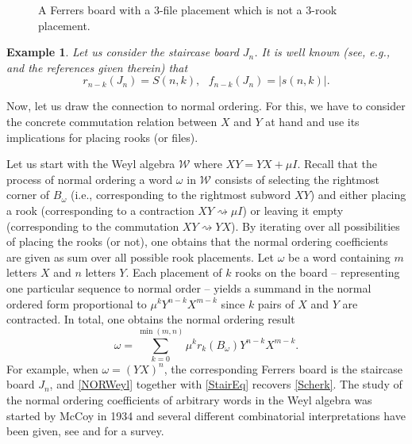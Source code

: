 \documentclass[10pt]{amsart}
\newtheorem{example}[theorem]{Example}%
\begin{document}
\begin{figure}[h]
\centering
{}
\caption{A Ferrers board with a $3$-file placement which is not a $3$-rook placement.}\label{FigFile}
\end{figure}
\begin{example}
Let us consider the {\em staircase board} $J_n$. It is well known (see, e.g., \cite[Section 2.4.4]{TMMS2016} and the references given therein) that 
\begin{equation}\label{StairEq}
r_{n-k}(J_n)=S(n,k), \,\,\,\, f_{n-k}(J_n)=|s(n,k)|.
\end{equation}
\end{example}

Now, let us draw the connection to normal ordering. For this, we have to consider the concrete commutation relation between $X$ and $Y$ at hand and use its implications for placing rooks (or files). 

Let us start with the Weyl algebra ${\mathcal W}$ where $XY=YX+\mu I$. Recall that the process of normal ordering a word $\omega$ in ${\mathcal W}$ consists of selecting the rightmost corner of $B_{\omega}$ (i.e., corresponding to the rightmost subword $XY$) and either placing a rook (corresponding to a contraction $XY \rightsquigarrow \mu I$) or leaving it empty (corresponding to the commutation $XY \rightsquigarrow YX $). By iterating over all possibilities of placing the rooks (or not), one obtains that the normal ordering coefficients are given as sum over all possible rook placements. Let $\omega$ be a word containing $m$ letters $X$ and $n$ letters $Y$. Each placement of $k$ rooks on the board -- representing one particular sequence to normal order --  yields a summand in the normal ordered form proportional to $\mu^k Y^{n-k}X^{m-k}$ since $k$ pairs of $X$ and $Y$ are contracted. In total, one obtains the normal ordering result \cite{SF1995,AV2005}
\begin{equation}\label{NORWeyl}
\omega=\sum_{k=0}^{\min(m,n)} \mu^k  r_k(B_{\omega}) Y^{n-k}X^{m-k}.
\end{equation}
For example, when $\omega=(YX)^n$, the corresponding Ferrers board is the staircase board $J_n$, and \eqref{NORWeyl} together with \eqref{StairEq} recovers \eqref{Scherk}. The study of the normal ordering coefficients of arbitrary words in the Weyl algebra was started by McCoy in 1934 \cite{Coy1934} and several different combinatorial interpretations have been given, see \cite{BLFL2011} and \cite{TMMS2016} for a survey.
\end{document}
